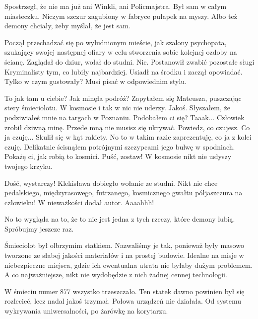 \divider{}

Spostrzegł, że nie ma już ani Winkli, ani Policmajstra. 
Był sam w całym miasteczku. Niczym szczur zagubiony w fabryce pułapek na myszy.
Albo też demony chciały, żeby myślał, że jest sam.

Począł przechadzać się po wyludnionym mieście, jak szalony psychopata, szukający swojej następnej ofiary w celu stworzenia sobie kolejnej ozdoby na ścianę. 
Zaglądał do dziur, wołał do studni. Nic.
Postanowił zwabić pozostałe sługi Kryminalisty tym, co lubiły najbardziej.
Usiadł na środku i zaczął opowiadać. Tylko w czym gustowały?
Musi pisać w odpowiednim stylu.

\divider{}

\begin{dialogue}
\ds{} To jak tam u ciebie? Jak minęła podróż? \dm{} Zapytałem się Mateusza, puszczając stery śmieciolotu. W kosmosie i tak w nic nie uderzy.
\ds{} Jakoś.
\ds{} Słyszałem, że podziwiałeś mnie na targach w Poznaniu. Podobałem ci się?
\ds{} Taaak... \dm{} Człowiek zrobił dziwną minę.
\ds{} Przede mną nie musisz się ukrywać. Powiedz, co czujesz.
\ds{} Co ja czuję... \dm{} Skulił się w kąt rakiety.
\ds{} No to w takim razie zaprezentuję, co ja z kolei czuję. \dm{} Delikatnie ścisnąłem potrójnymi szczypcami jego bulwę w spodniach. \dm{} Pokażę ci, jak robią to kosmici.
\ds{} Puść, zostaw!
\ds{} W kosmosie nikt nie usłyszy twojego krzyku.
\end{dialogue}

\divider{}

\begin{dialogue}
\ds{} Dość, wystarczy! \dm{} Klekisława dobiegło wołanie ze studni. \dm{} Nikt nie chce pedalskiego, międzyrasowego, futrzanego, kosmicznego gwałtu półjaszczura na człowieku!
\ds{} W nieważkości \dm{} dodał autor.
\ds{} Aaaahhh!
\end{dialogue}
No to wygląda na to, że to nie jest jedna z tych rzeczy, które demony lubią.
Spróbujmy jeszcze raz.

\divider{}

Śmieciolot był olbrzymim statkiem. 
Nazwaliśmy je tak, ponieważ były masowo tworzone ze słabej jakości materiałów i na prostej budowie.
Idealne na misje w niebezpieczne miejsca, gdzie ich ewentualna utrata nie byłaby dużym problemem. 
A co najważniejsze, nikt nie wydobędzie z nich żadnej cennej technologii.

W śmieciu numer 877 wszystko trzeszczało. 
Ten statek dawno powinien był się rozlecieć, lecz nadal jakoś trzymał.
Połowa urządzeń nie działała. Od systemu wykrywania uniwersalności, po żarówkę na korytarzu.

